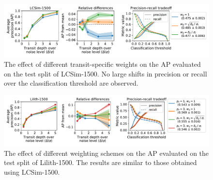 \begin{figure}
    \centering
    \includegraphics[width=0.95\linewidth]{Experiments/Figures/Models/lcsim1500_AP_weighting-w.pdf}
    \caption{The effect of different transit-specific weights on the AP evaluated on the test split of LCSim-1500. No large shifts in precision or recall over the classification threshold are observed. }
    \label{fig:lcsim_weight_w}
\end{figure}

\begin{figure}
    \centering
    \includegraphics[width=0.97\linewidth]{Experiments/Figures/Models/lilith1500_AP_weighting.pdf}
    \caption{The effect of different weighting schemes on the AP evaluated on the test split of Lilith-1500. The results are similar to those obtained using LCSim-1500.}
    \label{fig:lilith_weighting}
\end{figure}
